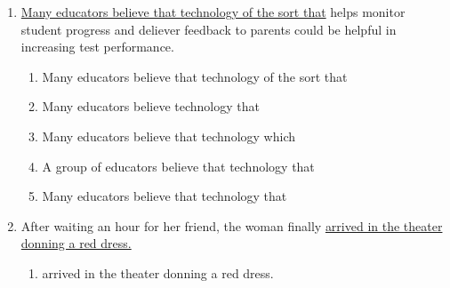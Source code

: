 \begin{enumerate}
\begin{enumerate}
\begin{spacing}{1.5}
\begin{enumerate}[label=(\Alph*)]
\hrulefill
\item featured many well-respected actors, was winning many awards for

\hrulefill
\item featured many actors that were well-respected and won many awards for

\hrulefill
\item had featured many well-respected actors and won many awards for

\hrulefill
\item featured many well-respected actors and won many awards for

\hrulefill
\end{enumerate}
\end{spacing}

\bigskip
\item \ul{Many educators believe that technology of the sort that} helps monitor student progress and deliever feedback to parents could be helpful in increasing test performance. 

\begin{spacing}{1.5}
\begin{enumerate}[label=(\Alph*)]
\item Many educators believe that technology of the sort that

\hrulefill
\item Many educators believe technology that

\hrulefill
\item Many educators believe that technology which

\hrulefill
\item A group of educators believe that technology that

\hrulefill
\item Many educators believe that technology that

\hrulefill
\end{enumerate}
\end{spacing}

\bigskip
\item After waiting an hour for her friend, the woman finally \ul{arrived in the theater donning a red dress.}

\begin{spacing}{1.5}
\begin{enumerate}[label=(\Alph*)]
\item arrived in the theater donning a red dress.

\hrulefill


\end{enumerate}
\end{spacing}
\end{enumerate}
\end{enumerate}
